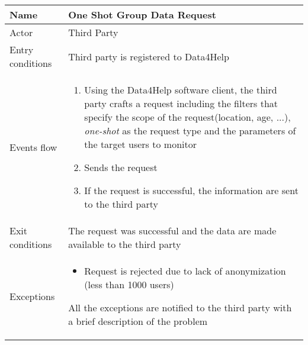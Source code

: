 \begin{table}[h!]
    \begin{tabular}{|l|p{12cm}|}
        \hline
        Name             & One Shot Group Data Request \\ \hline
        Actor            & Third Party \\ \hline
        Entry conditions & Third party is registered to Data4Help \\ \hline
        Events flow      & 
        \begin{enumerate}
            \item Using the Data4Help software client, the third party crafts a request including the filters that specify the scope of the request(location, age, ...), \textit{one-shot} as the request type and the parameters of the target users to monitor
            \item Sends the request
            \item If the request is successful, the information are sent to the third party
        \end{enumerate} \\ \hline
        Exit conditions  & The request was successful and the data are made available 
        to the third party \\ \hline
        Exceptions       & 
        \begin{itemize}
            \item Request is rejected due to lack of anonymization (less than 1000 users)
        \end{itemize} All the exceptions are notified to the third party with a brief description of the problem \\ \hline
    \end{tabular}
\end{table}

\newpage

